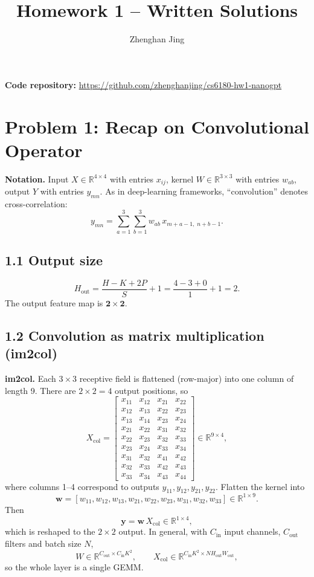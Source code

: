 \documentclass[11pt]{article}
\title{Homework 1 -- Written Solutions}
\author{Zhenghan Jing}
\date{}
\begin{document}
\maketitle
\vspace{-1.5em}
\begin{center}
\textbf{Code repository:} \url{https://github.com/zhenghanjing/cs6180-hw1-nanogpt}
\end{center}

\section*{Problem 1: Recap on Convolutional Operator}

\textbf{Notation.} Input $X\in\mathbb{R}^{4\times4}$ with entries $x_{ij}$, kernel $W\in\mathbb{R}^{3\times3}$ with entries $w_{ab}$, output $Y$ with entries $y_{mn}$. As in deep-learning frameworks, ``convolution'' denotes cross-correlation:
\[
y_{mn}=\sum_{a=1}^{3}\sum_{b=1}^{3} w_{ab}\,x_{m+a-1,\;n+b-1}.
\]

\subsection*{1.1 Output size}
\[
H_{\text{out}}=\frac{H-K+2P}{S}+1=\frac{4-3+0}{1}+1=2 .
\]
The output feature map is $\mathbf{2\times 2}$.

\subsection*{1.2 Convolution as matrix multiplication (im2col)}

\textbf{im2col.} Each $3\times3$ receptive field is flattened (row-major) into one column of length 9. There are $2\times2=4$ output positions, so
\[
X_{\text{col}}=
\begin{bmatrix}
x_{11}&x_{12}&x_{21}&x_{22}\\
x_{12}&x_{13}&x_{22}&x_{23}\\
x_{13}&x_{14}&x_{23}&x_{24}\\
x_{21}&x_{22}&x_{31}&x_{32}\\
x_{22}&x_{23}&x_{32}&x_{33}\\
x_{23}&x_{24}&x_{33}&x_{34}\\
x_{31}&x_{32}&x_{41}&x_{42}\\
x_{32}&x_{33}&x_{42}&x_{43}\\
x_{33}&x_{34}&x_{43}&x_{44}
\end{bmatrix}\in\mathbb{R}^{9\times4},
\]
where columns 1--4 correspond to outputs $y_{11},y_{12},y_{21},y_{22}$. Flatten the kernel into
\[
\mathbf{w}=[w_{11},w_{12},w_{13},w_{21},w_{22},w_{23},w_{31},w_{32},w_{33}]\in\mathbb{R}^{1\times9}.
\]
Then
\[
\mathbf{y}=\mathbf{w}\,X_{\text{col}}\in\mathbb{R}^{1\times4},
\]
which is reshaped to the $2\times2$ output. In general, with $C_{\text{in}}$ input channels, $C_{\text{out}}$ filters and batch size $N$,
\[
W\in\mathbb{R}^{C_{\text{out}}\times C_{\text{in}}K^2},\qquad X_{\text{col}}\in\mathbb{R}^{C_{\text{in}}K^2\times N H_{\text{out}}W_{\text{out}}},
\]
so the whole layer is a single GEMM.
\end{document}
